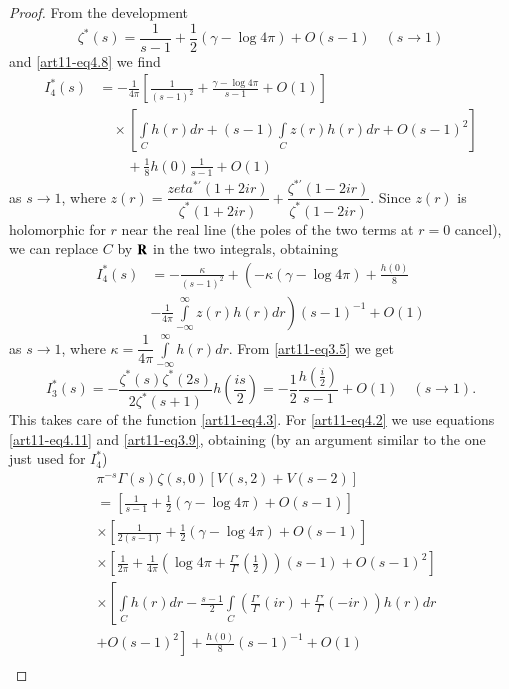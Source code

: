 \begin{proof}
From the development
$$
\zeta^{\ast} (s) = \frac{1}{s-1} + \frac{1}{2} (\gamma - \log 4 \pi)  + O(s-1) \quad (s\to 1)
$$
and \eqref{art11-eq4.8} we find 
\begin{align*}
I^\ast_4 (s) & = - \frac{1}{4 \pi} \left[\frac{1}{(s-1)^2} + \frac{\gamma - \log 4 \pi}{s -1} + O(1)\right]\\
& \quad \times \left[\int\limits_C h(r) dr + (s-1) \int\limits_C z(r) h(r) dr + O(s-1)^2 \right]\\
& \quad\quad  + \frac{1}{8}  h(0) \frac{1}{s-1} + O(1)
\end{align*}
as $s \to 1$, where $z(r) = \dfrac{zeta^{\ast'} (1+2 ir)}{\zeta^\ast (1+ 2ir )} + \dfrac{\zeta^{\ast'} (1-2ir)}{\zeta^\ast (1-2 ir)}$. Since $z(r)$ is holomorphic for $r$ near the real line (the poles of the two terms at $r=0$ cancel), we can replace $C$ by $\mathbf{R}$ in the two integrals, obtaining 
\begin{align*}
I^\ast_4 (s) & =  -\frac{\kappa}{(s-1)^2} + \left(-\kappa (\gamma - \log 4 \pi) + \frac{h(0)}{8}  \right.\\
&\left.  - \frac{1}{4 \pi} \int\limits^\infty_{-\infty} z(r) h (r) dr \right) (s-1)^{-1} + O(1)
\end{align*}
as $s \to 1$, where $\kappa = \dfrac{1}{4 \pi} \int\limits^\infty_{-\infty} h(r) dr$. From \eqref{art11-eq3.5} we get 
$$
I^\ast_3 (s) = - \frac{\zeta^\ast (s) \zeta^{\ast} (2s)}{2 \zeta^\ast (s+1)} h \left(\frac{is}{2} \right) = - \frac{1}{2} \frac{h(\frac{i}{2})}{s-1} + O(1) \quad (s \to 1).
$$
This takes care of the function \eqref{art11-eq4.3}. For \eqref{art11-eq4.2} we use equations \eqref{art11-eq4.11} and \eqref{art11-eq3.9}, obtaining (by an argument similar to the one just used for $I^\ast_4$) 
\begin{align*}
& \pi^{-s} \Gamma (s) \zeta(s,0) [V(s,2) + V (s-2)]\\
& = \left[ \frac{1}{s-1} + \frac{1}{2} (\gamma -\log 4 \pi) + O(s-1) \right]\\
& \times \left[\frac{1}{2 (s-1)} + \frac{1}{2} (\gamma - \log 4 \pi) + O(s-1) \right]\\
& \times \left[\frac{1}{2\pi} + \frac{1}{4 \pi} \left(\log 4 \pi +\frac{\Gamma'}{\Gamma} (\frac{1}{2}) \right) (s-1) + O(s-1)^2\right]\\
& \times \left[\int\limits_C h (r)dr - \frac{s-1}{2} \int\limits_C \left(\frac{\Gamma'}{\Gamma} (ir) + \frac{\Gamma'}{\Gamma} (-ir) \right)  h (r) dr \right.\\
&\left.  + O(s-1)^2\right] + \frac{h(0)}{8} (s-1)^{-1} + O(1)\\

\end{align*}
\end{proof}
